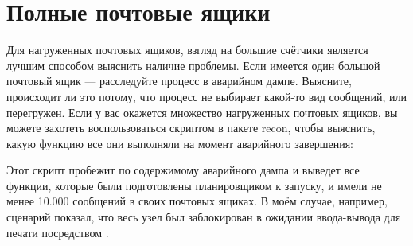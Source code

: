 \section{Полные почтовые ящики}
\label{sec:crash-full-mailboxes}

Для нагруженных почтовых ящиков, взгляд на большие счётчики является лучшим способом выяснить наличие проблемы. Если имеется один большой почтовый ящик --- расследуйте процесс в аварийном дампе. Выясните, происходит ли это потому, что процесс не выбирает какой-то вид сообщений, или перегружен. Если у вас окажется множество нагруженных почтовых ящиков, вы можете захотеть воспользоваться скриптом  в пакете recon, чтобы выяснить, какую функцию все они выполняли на момент аварийного завершения:


Этот скрипт пробежит по содержимому аварийного дампа и выведет все функции, которые были подготовлены планировщиком к запуску, и имели не менее 10.000 сообщений в своих почтовых ящиках. В моём случае, например, сценарий показал, что весь узел был заблокирован в ожидании ввода-вывода для печати посредством .


